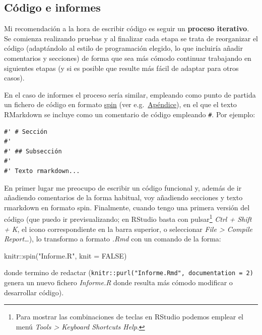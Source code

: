 \documentclass[
]{book}
\newenvironment{Shaded}{\begin{snugshade}}{\end{snugshade}}
\newcommand{\AttributeTok}[1]{\textcolor[rgb]{0.77,0.63,0.00}{#1}}
\newcommand{\ConstantTok}[1]{\textcolor[rgb]{0.00,0.00,0.00}{#1}}
\newcommand{\FunctionTok}[1]{\textcolor[rgb]{0.00,0.00,0.00}{#1}}
\newcommand{\NormalTok}[1]{#1}
\newcommand{\SpecialCharTok}[1]{\textcolor[rgb]{0.00,0.00,0.00}{#1}}
\newcommand{\StringTok}[1]{\textcolor[rgb]{0.31,0.60,0.02}{#1}}
\theoremstyle{break}
\theoremstyle{nonumberplain}
\begin{document}
\hypertarget{codigo}{%
\subsection{Código e informes}\label{codigo}}

Mi recomendación a la hora de escribir código es seguir un \textbf{proceso iterativo}.
Se comienza realizando pruebas y al finalizar cada etapa se trata de reorganizar el código (adaptándolo al estilo de programación elegido, lo que incluiría añadir comentarios y secciones) de forma que sea más cómodo continuar trabajando en siguientes etapas (y si es posible que resulte más fácil de adaptar para otros casos).

En el caso de informes el proceso sería similar, empleando como punto de partida un fichero de código en formato \href{https://rubenfcasal.github.io/bookdown_intro/rmarkdown.html\#spin}{spin} (ver e.g.~\href{https://rubenfcasal.github.io/bookdown_intro/rmarkdown.html\#spin}{Apéndice}), en el que el texto RMarkdown se incluye como un comentario de código empleando \texttt{\#\textquotesingle{}}. Por ejemplo:

\begin{verbatim}
#' # Sección
#'
#' ## Subsección
#'
#' Texto rmarkdown...
\end{verbatim}

En primer lugar me preocupo de escribir un código funcional y, además de ir añadiendo comentarios de la forma habitual, voy añadiendo secciones y texto rmarkdown en formato spin.
Finalmente, cuando tengo una primera versión del código (que puedo ir previsualizando; en RStudio basta con pulsar\footnote{Para mostrar las combinaciones de teclas en RStudio podemos emplear el menú \emph{Tools \textgreater{} Keyboard Shortcuts Help}.} \emph{Ctrl + Shift + K}, el icono correspondiente en la barra superior, o seleccionar \emph{File \textgreater{} Compile Report\ldots{}}), lo transformo a formato \emph{.Rmd} con un comando de la forma:

\begin{Shaded}
\begin{Highlighting}[]
\NormalTok{knitr}\SpecialCharTok{::}\FunctionTok{spin}\NormalTok{(}\StringTok{"Informe.R"}\NormalTok{, }\AttributeTok{knit =} \ConstantTok{FALSE}\NormalTok{)}
\end{Highlighting}
\end{Shaded}

donde termino de redactar (\texttt{knitr::purl("Informe.Rmd",\ documentation\ =\ 2)} genera un nuevo fichero \emph{Informe.R} donde resulta más cómodo modificar o desarrollar código).
\end{document}
